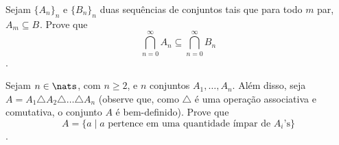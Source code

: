 \begin{exercise}
Sejam $\{A_n\}_n$ e $\{B_n\}_n$ duas sequências de conjuntos tais que para todo $m$ par, $A_m \subseteq B_{	}$. Prove que $$\bigcap_{n=0}^{\infty} A_n \subseteq \bigcap_{n=0}^{\infty} B_n$$.
\end{exercise}

\begin{exercise}
Sejam $n \in \nats$, com $n \ge 2$, e $n$ conjuntos $A_1, \dots, A_n$. Além disso, seja $A = A_1 \triangle A_2 \triangle \dots \triangle A_n$ (observe que, como $\triangle$ é uma operação associativa e comutativa, o conjunto $A$ é bem-definido). Prove que $$A = \{a \mid a \text{ pertence em uma quantidade ímpar de $A_i$'s}\}$$.
\end{exercise}